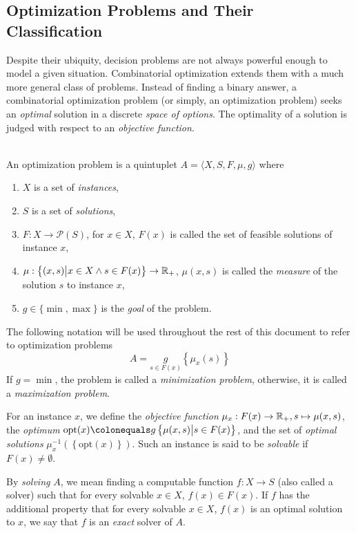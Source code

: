 \subsection{Optimization Problems and Their Classification}

Despite their ubiquity, decision problems are not always powerful enough to model a given situation. Combinatorial optimization extends them with a much more general class of problems. Instead of finding a binary answer, a combinatorial optimization problem (or simply, an optimization problem) seeks an \emph{optimal} solution in a discrete \emph{space of options}. The optimality of a solution is judged with respect to an \emph{objective function}.

\begin{definition}\ \\
    \label{def:optimization-problem}
    An optimization problem is a quintuplet \(A=\langle X, S, F, \mu, g\rangle\) where
    \begin{enumerate}[label=\emph{(\roman*)}]
        \item \(X\) is a set of \emph{instances},
        \item \(S\) is a set of \emph{solutions},
        \item \(F:X\rightarrow \mathcal{P}(S)\), for \(x\in X\), \(F(x)\) is called the set of feasible solutions of instance \(x\),
        \item \(\mu:\left\{(x, s) \big| x\in X \wedge s\in F(x) \right\} \rightarrow \mathbb{R}_+\), \(\mu(x, s)\) is called the \emph{measure} of the solution \(s\) to instance \(x\),
        \item \(g\in\{\min, \max\}\) is the \emph{goal} of the problem.
    \end{enumerate}

    The following notation will be used throughout the rest of this document to refer to optimization problems
    \[
       A = \underset{s\in F(x)}{g}\left\{\mu_x(s)\right\}    
    \]
    If \(g =\min\), the problem is called a \emph{minimization problem}, otherwise, it is called a \emph{maximization problem}.

    For an instance \(x\), we define the \emph{objective function} \(\mu_x:F(x) \rightarrow \mathbb{R}_+, s \mapsto \mu(x, s)\), the \emph{optimum} \(\mathrm{opt}(x)\colonequals g\left\{\mu(x, s)\big|s\in F(x)\right\}\), and the set of \emph{optimal solutions} 
    \(\mu_x^{-1}\left(\left\{\mathrm{opt}(x)\right\}\right)\). Such an instance is said to be \emph{solvable} if \(F(x)\neq\emptyset\).

    By \emph{solving} \(A\), we mean finding a computable function \(f:X\rightarrow S\) (also called a solver) such that for every solvable \(x\in X\), \(f(x)\in F(x)\). If \(f\) has the additional property that for every solvable \(x\in X\), \(f(x)\) is an optimal solution to \(x\), we say that \(f\) is an \emph{exact} solver of \(A\).
\end{definition}


